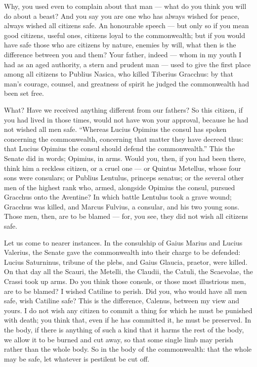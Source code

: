  Why, you used even to complain about that man --- what do you think you will do about a beast? And you say you are one who has always wished for peace, always wished all citizens safe. An honourable speech --- but only so if you mean good citizens, useful ones, citizens loyal to the commonwealth; but if you would have safe those who are citizens by nature, enemies by will, what then is the difference between you and them? Your father, indeed --- whom in my youth I had as an aged authority, a stern and prudent man --- used to give the first place among all citizens to Publius Nasica, who killed Tiberius Gracchus: by that man's courage, counsel, and greatness of spirit he judged the commonwealth had been set free.

 What? Have we received anything different from our fathers? So this citizen, if you had lived in those times, would not have won your approval, because he had not wished all men safe. ``Whereas Lucius Opimius the consul has spoken concerning the commonwealth, concerning that matter they have decreed thus: that Lucius Opimius the consul should defend the commonwealth.'' This the Senate did in words; Opimius, in arms. Would you, then, if you had been there, think him a reckless citizen, or a cruel one --- or Quintus Metellus, whose four sons were consulars; or Publius Lentulus, princeps senatus; or the several other men of the highest rank who, armed, alongside Opimius the consul, pursued Gracchus onto the Aventine? In which battle Lentulus took a grave wound; Gracchus was killed, and Marcus Fulvius, a consular, and his two young sons. Those men, then, are to be blamed --- for, you see, they did not wish all citizens safe.

 Let us come to nearer instances. In the consulship of Gaius Marius and Lucius Valerius, the Senate gave the commonwealth into their charge to be defended: Lucius Saturninus, tribune of the plebs, and Gaius Glaucia, praetor, were killed. On that day all the Scauri, the Metelli, the Claudii, the Catuli, the Scaevolae, the Crassi took up arms. Do you think those consuls, or those most illustrious men, are to be blamed? I wished Catiline to perish. Did you, who would have all men safe, wish Catiline safe? This is the difference, Calenus, between my view and yours. I do not wish any citizen to commit a thing for which he must be punished with death; you think that, even if he has committed it, he must be preserved. In the body, if there is anything of such a kind that it harms the rest of the body, we allow it to be burned and cut away, so that some single limb may perish rather than the whole body. So in the body of the commonwealth: that the whole may be safe, let whatever is pestilent be cut off.

